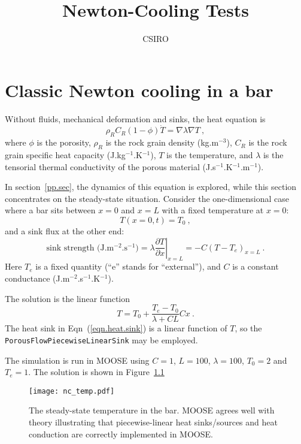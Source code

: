 \documentclass[]{scrreprt}
\begin{document}
\title{Newton-Cooling Tests}
\author{CSIRO}
\maketitle

\tableofcontents

\chapter{Classic Newton cooling in a bar}

Without fluids, mechanical deformation and sinks, the heat equation is
\begin{equation}
\rho_{R}C_{R}(1-\phi)\dot{T} = \nabla\lambda\nabla T \ ,
\end{equation}
where $\phi$ is the porosity, $\rho_{R}$ is the rock grain density
(kg.m$^{-3}$), $C_{R}$ is the rock grain specific heat capacity
(J.kg$^{-1}$.K$^{-1}$), $T$ is the temperature, and $\lambda$ is the
tensorial thermal conductivity of the porous material
(J.s$^{-1}$.K$^{-1}$.m$^{-1}$).

In section~\ref{pp.sec}, the dynamics of this equation is explored,
while this section concentrates on the steady-state situation.
Consider the one-dimensional case where a bar sits between $x=0$ and
$x=L$ with a fixed temperature at $x=0$:
\begin{equation}
T(x=0, t) = T_{0} \ ,
\end{equation}
and a sink flux at the other end:
\begin{equation}
\mbox{sink strength (J.m$^{-2}$.s$^{-1}$)} = \left.\lambda\frac{\partial
  T}{\partial x}\right|_{x=L} = -C\left(T - T_{e}\right)_{x=L} \ .
\label{eqn.heat.sink}
\end{equation}
Here $T_{e}$ is a fixed quantity (``e'' stands for ``external''), and
$C$ is a constant conductance (J.m$^{-2}$.s$^{-1}$.K$^{-1}$).

The solution is the linear function
\begin{equation}
T = T_{0} + \frac{T_{e} - T_{0}}{\lambda + C L} C x \ .
\end{equation}
The heat sink in Eqn~(\ref{eqn.heat.sink}) is a linear function of
$T$, so the {\tt PorousFlowPiecewiseLinearSink} may be employed.

The simulation is run in MOOSE using $C=1$, $L=100$, $\lambda=100$,
$T_{0}=2$ and $T_{e}=1$.  The solution is shown in Figure~\ref{nc_heat.fig}

\begin{figure}[htb]
\begin{center}
\texttt{[image: nc\_temp.pdf]}
\caption{The steady-state temperature in the bar.  MOOSE agrees well
  with theory illustrating that piecewise-linear heat sinks/sources
  and heat conduction are correctly implemented in MOOSE.}
\label{nc_heat.fig}
\end{center}
\end{figure}
\end{document}
